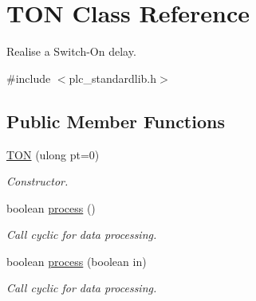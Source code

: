 \hypertarget{class_t_o_n}{\section{T\+O\+N Class Reference}
\label{class_t_o_n}
}


Realise a Switch-\/\+On delay.  




{\ttfamily \#include $<$plc\+\_\+standardlib.\+h$>$}

\subsection*{Public Member Functions}
\begin{DoxyCompactItemize}
\item 
\hyperlink{class_t_o_n_a7f2cc077398ea97c462fd3b42af8317e}{T\+O\+N} (ulong pt=0)
\begin{DoxyCompactList}\small\item\em Constructor. \end{DoxyCompactList}\item 
\hypertarget{class_t_o_n_ac38e012a415e93cada3d54e80b123245}{boolean \hyperlink{class_t_o_n_ac38e012a415e93cada3d54e80b123245}{process} ()}\label{class_t_o_n_ac38e012a415e93cada3d54e80b123245}

\begin{DoxyCompactList}\small\item\em Call cyclic for data processing. \end{DoxyCompactList}\item 
boolean \hyperlink{class_t_o_n_a00e2a9cd0d5576cb7fb9f74d1d07b545}{process} (boolean in)
\begin{DoxyCompactList}\small\item\em Call cyclic for data processing. \end{DoxyCompactList}\end{DoxyCompactItemize}
